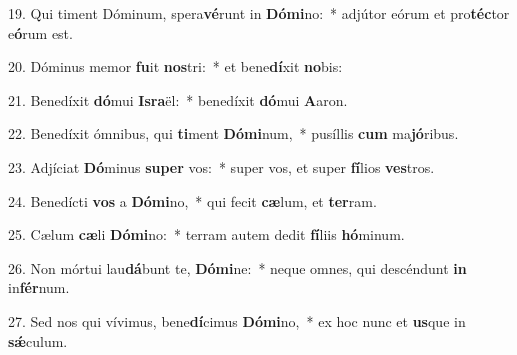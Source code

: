 19. Qui timent Dóminum, spera\textbf{vé}runt in \textbf{Dó}\textbf{mi}no:~*  adjútor eórum et pro\textbf{téc}tor e\textbf{ó}rum est.\

20. Dóminus memor \textbf{fu}it \textbf{nos}tri:~*  et bene\textbf{dí}xit \textbf{no}bis:\

21. Benedíxit \textbf{dó}mui \textbf{Is}\textbf{ra}ël:~*  benedíxit \textbf{dó}mui \textbf{A}aron.\

22. Benedíxit ómnibus, qui \textbf{ti}ment \textbf{Dó}\textbf{mi}num,~*  pusíllis \textbf{cum} ma\textbf{jó}ribus.\

23. Adjíciat \textbf{Dó}minus \textbf{su}\textbf{per} vos:~*  super vos, et super \textbf{fí}lios \textbf{ves}tros.\

24. Benedícti \textbf{vos} a \textbf{Dó}\textbf{mi}no,~*  qui fecit \textbf{cæ}lum, et \textbf{ter}ram.\

25. Cælum \textbf{cæ}li \textbf{Dó}\textbf{mi}no:~*  terram autem dedit \textbf{fí}liis \textbf{hó}minum.\

26. Non mórtui lau\textbf{dá}bunt te, \textbf{Dó}\textbf{mi}ne:~*  neque omnes, qui descéndunt \textbf{in} in\textbf{fér}num.\

27. Sed nos qui vívimus, bene\textbf{dí}cimus \textbf{Dó}\textbf{mi}no,~*  ex hoc nunc et \textbf{us}que in \textbf{sǽ}culum.\

